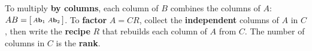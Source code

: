 \documentclass[10pt]{article}
\begin{document}
\vspace{0.10in}

\begin{remindbox}
\small To multiply \textbf{by columns}, each column of $B$ combines the columns of $A$:
$AB=\begin{bsmallmatrix} A\mathbf{b}_1 & A\mathbf{b}_2 \end{bsmallmatrix}$. To \textbf{factor}
$A=CR$, collect the \textbf{independent} columns of $A$ in $C$, then write the \textbf{recipe} $R$
that rebuilds each column of $A$ from $C$. The number of columns in $C$ is the \textbf{rank}.
\end{remindbox}
\end{document}
